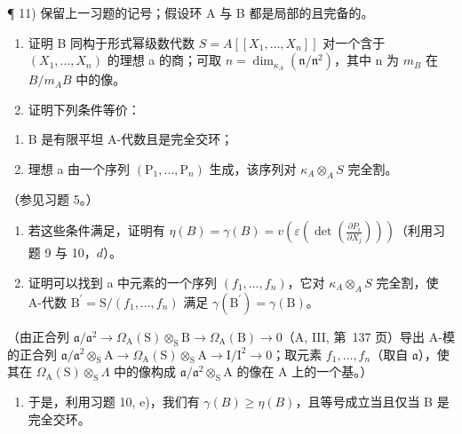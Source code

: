 ¶ 11) 保留上一习题的记号；假设环 A 与 B 都是局部的且完备的。

\begin{enumerate}
\def\labelenumi{\alph{enumi})}
\item
  证明 B 同构于形式幂级数代数 \(S = A[[X_{1}, \ldots, X_{n}]]\) 对一个含于 \((X_{1}, \ldots, X_{n})\) 的理想 a 的商；可取 \(n = \dim_{\kappa_{A}}(\mathfrak{n}/\mathfrak{n}^{2})\)，其中 n 为 \(m_{B}\) 在 \(B/m_{A}B\) 中的像。
\item
  证明下列条件等价：
\end{enumerate}

\begin{enumerate}
\def\labelenumi{(\roman{enumi})}
\item
  B 是有限平坦 A-代数且是完全交环；
\item
  理想 a 由一个序列 \((\mathrm{P}_{1},\ldots,\mathrm{P}_{n})\) 生成，该序列对 \(\kappa_{A}\otimes_{A}S\) 完全割。
\end{enumerate}

（参见习题 5。）

\begin{enumerate}
\def\labelenumi{\alph{enumi})}
\setcounter{enumi}{2}
\item
  若这些条件满足，证明有 \(\eta(B) = \gamma(B) = v(\varepsilon(\det(\frac{\partial P_i}{\partial X_j})))\)（利用习题 9 与 10，\(d\)）。
\item
  证明可以找到 a 中元素的一个序列 \((f_{1},\ldots,f_{n})\)，它对 \(\kappa_{A}\otimes_{A}S\) 完全割，使 A-代数 \(\mathrm{B}^{\prime}=\mathrm{S}/(f_{1},\ldots,f_{n})\) 满足 \(\gamma(\mathrm{B}^{\prime})=\gamma(\mathrm{B})\)。
\end{enumerate}

（由正合列 \(\mathfrak{a}/\mathfrak{a}^{2}\to\Omega_{\mathrm{A}}(\mathrm{S})\otimes_{\mathrm{S}}\mathrm{B}\to\Omega_{\mathrm{A}}(\mathrm{B})\to0\)（A, III, 第~137 页）导出 A-模的正合列 \(\mathfrak{a}/\mathfrak{a}^{2}\otimes_{\mathrm{S}}\mathrm{A}\to\Omega_{\mathrm{A}}(\mathrm{S})\otimes_{\mathrm{S}}\mathrm{A}\to\mathrm{I}/\mathrm{I}^{2}\to0\)；取元素 \(f_{1},\ldots,f_{n}\)（取自 \(\mathfrak{a}\)），使其在 \(\Omega_{\mathrm{A}}(\mathrm{S})\otimes_{\mathrm{S}}\Lambda\) 中的像构成 \(\mathfrak{a}/\mathfrak{a}^{2}\otimes_{\mathrm{S}}\mathrm{A}\) 的像在 A 上的一个基。）

\begin{enumerate}
\def\labelenumi{\alph{enumi})}
\setcounter{enumi}{4}
\tightlist
\item
  于是，利用习题 10, e)，我们有 \(\gamma(B) \geqslant \eta(B)\)，且等号成立当且仅当 B 是完全交环。
\end{enumerate}

